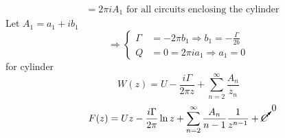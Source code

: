 \begin{itemize}
\begin{align*}
&=2\pi iA_1\text{ for all circuits enclosing the cylinder}
\end{align*}
Let $A_1 = a_1 + ib_1$
\[
\Longrightarrow
\left\{
\begin{aligned}
\Gamma &= -2\pi b_1\Longrightarrow b_1 = -\frac{\Gamma}{2b} \\
Q &= 0 = 2\pi ia_1\Longrightarrow a_1 = 0
\end{aligned}
\right.
\]
for cylinder
\begin{equation}
W(z) = U - \frac{i\Gamma}{2\pi z} + \sum_{n=2}^\infty\frac{A_n}{z_n}
\label{eq: 5-2-34}
\end{equation}
\begin{equation}
F(z) = Uz - \frac{i\Gamma}{2\pi}\ln z + \sum_{n=2}^\infty\frac{A_n}{n-1}\frac{1}{z^{n-1}} + \cancelto{0}{C}
\label{eq: 5-2-35}
\end{equation}
\end{itemize}
